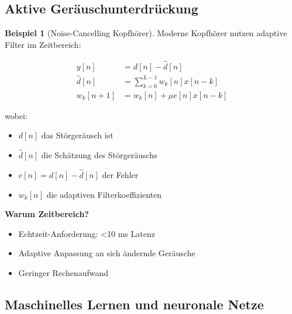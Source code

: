 ﻿\documentclass[a4paper,12pt]{report}
\theoremstyle{definition}
\newtheorem{beispiel}{Beispiel}
\begin{document}
	\subsection{Aktive Geräuschunterdrückung}
	
	\begin{beispiel}[Noise-Cancelling Kopfhörer]
		Moderne Kopfhörer nutzen adaptive Filter im Zeitbereich:
		
		\begin{align}
			y[n] &= d[n] - \hat{d}[n] \\
			\hat{d}[n] &= \sum_{k=0}^{L-1} w_k[n] x[n-k] \\
			w_k[n+1] &= w_k[n] + \mu e[n] x[n-k]
		\end{align}
		
		wobei:
		\begin{itemize}
			\item[-] $d[n]$ das Störgeräusch ist
			\item[-] $\hat{d}[n]$ die Schätzung des Störgeräuschs
			\item[-] $e[n] = d[n] - \hat{d}[n]$ der Fehler
			\item[-] $w_k[n]$ die adaptiven Filterkoeffizienten
		\end{itemize}
		
		\textbf{Warum Zeitbereich?}
		\begin{itemize}
			\item[-] Echtzeit-Anforderung: <10 ms Latenz
			\item[-] Adaptive Anpassung an sich ändernde Geräusche
			\item[-] Geringer Rechenaufwand
		\end{itemize}
	\end{beispiel}
	
	\subsection{Maschinelles Lernen und neuronale Netze}
	
\end{document}
